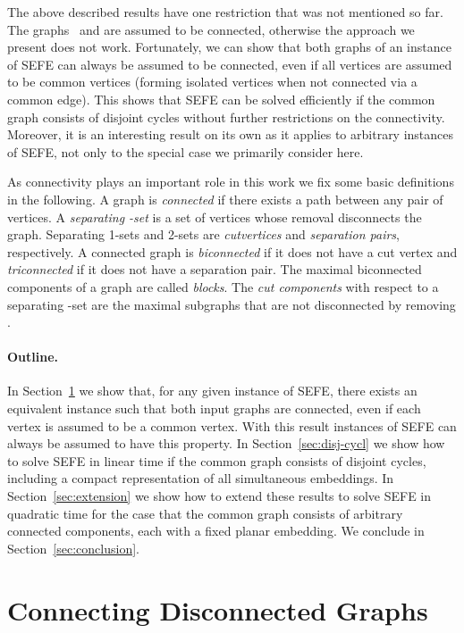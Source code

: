 \documentclass{scrartcl}
\newcommand{\1}[1]{{\normalfont \ensuremath{#1^{\tiny\circled{1}}}}} \newcommand{\2}[1]{{\normalfont \ensuremath{#1^{\tiny\circled{2}}}}} \renewcommand{\k}[1]{{\normalfont \ensuremath{#1^{\tiny\circled{k}}}}} \newcommand{\proj}[2]{\ensuremath{\left.#1\right|_{#2}}} \newcommand{\eps}{\varepsilon}
\theoremstyle{plain} \newtheorem{theorem}{Theorem} \newcounter{lemmacounter} \setcounter{lemmacounter}{0} \newtheorem{lemma}[lemmacounter]{Lemma} \newtheorem{fact}{Fact}  \newtheorem{corollary}{Corollary} \theoremstyle{definition} \newtheorem{definition}{Definition}
\begin{document}
The above described results have one restriction that was not
mentioned so far.  The graphs~ and  are assumed to be
connected, otherwise the approach we present does not work.
Fortunately, we can show that both graphs of an instance of {\sc SEFE}
can always be assumed to be connected, even if all vertices are
assumed to be common vertices (forming isolated vertices when not
connected via a common edge).  This shows that {\sc SEFE} can be solved
efficiently if the common graph consists of disjoint cycles without
further restrictions on the connectivity.  Moreover, it is an
interesting result on its own as it applies to arbitrary instances of
{\sc SEFE}, not only to the special case we primarily consider here.

As connectivity plays an important role in this work we fix some basic
definitions in the following.  A graph is \emph{connected} if there
exists a path between any pair of vertices.  A \emph{separating
  -set} is a set of  vertices whose removal disconnects the
graph.  Separating 1-sets and 2-sets are \emph{cutvertices} and
\emph{separation pairs}, respectively.  A connected graph is
\emph{biconnected} if it does not have a cut vertex and
\emph{triconnected} if it does not have a separation pair.  The
maximal biconnected components of a graph are called \emph{blocks}.
The \emph{cut components} with respect to a separating -set  are
the maximal subgraphs that are not disconnected by removing .

\paragraph{Outline.}

In Section~\ref{sec:disconnected-graphs} we show that, for any given
instance of {\sc SEFE}, there exists an equivalent instance such that
both input graphs are connected, even if each vertex is assumed to be
a common vertex.  With this result instances of {\sc SEFE} can always
be assumed to have this property.  In Section~\ref{sec:disj-cycl} we
show how to solve {\sc SEFE} in linear time if the common graph
consists of disjoint cycles, including a compact representation of all
simultaneous embeddings.  In Section~\ref{sec:extension} we show how
to extend these results to solve {\sc SEFE} in quadratic time for the
case that the common graph consists of arbitrary connected components,
each with a fixed planar embedding.  We conclude in
Section~\ref{sec:conclusion}.

\section{Connecting Disconnected Graphs}
\label{sec:disconnected-graphs}
\end{document}
